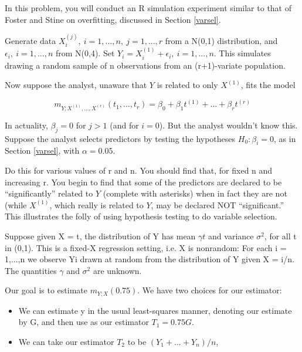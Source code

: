 \oneproblem In this problem, you will conduct an R simulation experiment
similar to that of Foster and Stine on overfitting, discussed in Section
\ref{varsel}.  

Generate data $X_i^{(j)}, ~ i = 1,...,n, ~ j = 1,...,r$ from a N(0,1)
distribution, and $\epsilon_i, ~ i = 1,...,n$ from N(0,4).  Set
$Y_i = X_i^{(1)} + \epsilon_i, ~ i = 1,...,n$.  This simulates drawing a
random sample of n observations from an (r+1)-variate population.

Now suppose the analyst, unaware that $Y$ is related to only $X^{(1)}$,
fits the model

\begin{equation}
m_{Y;X^{(1)},...,X^{(r)}}(t_1,...,t_r) =
\beta_0 + \beta_1 t^{(1)} + ... + \beta_r t^{(r)}
\end{equation}

In actuality, $\beta_j = 0$ for $j > 1$ (and for $i = 0$).
But the analyst wouldn't know this. Suppose the analyst selects    
predictors by testing the hypotheses $H_0: \beta_i = 0$, as in Section
\ref{varsel}, with $\alpha = 0.05$.

Do this for various values of r and n. You should find that, for fixed n
and increasing r.  You begin to find that some of the predictors are
declared to be ``significantly'' related to $Y$ (complete with
asterisks) when in fact they are not  (while $X^{(1)}$, which really is
related to $Y$, may be declared NOT ``significant.''  This illustrates
the folly of using hypothesis testing to do variable selection.

\oneproblem
Suppose given X = t, the distribution of Y has mean $\gamma t$ and
variance $\sigma^2$, for all t in (0,1). This is a fixed-X regression
setting, i.e. X is nonrandom: For each i = 1,...,n we observe Yi drawn
at random from the distribution of Y given X = i/n. The quantities
$\gamma$ and $\sigma^2$ are unknown.

Our goal is to estimate $m_{Y;X}(0.75)$. We have two choices for our estimator:

\begin{itemize}

\item We can estimate y in the usual least-squares manner, denoting our
estimate by G, and then use as our estimator $T_1 = 0.75 G$.
    
\item We can take our estimator $T_2$ to be 
$(Y_1+...+Y_n)/n$,

\end{itemize}

